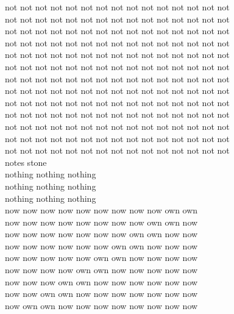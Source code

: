 not not not not not not not not not not not not not not not\\
not not not not not not not not not not not not not not not\\
not not not not not not not not not not not not not not not\\
not not not not not not not not not not not not not not not\\
not not not not not not not not not not not not not not not\\
not not not not not not not not not not not not not not not\\
not not not not not not not not not not not not not not not\\
not not not not not not not not not not not not not not not\\
not not not not not not not not not not not not not not not\\
not not not not not not not not not not not not not not not\\
not not not not not not not not not not not not not not not\\
not not not not not not not not not not not not not not not\\
not not not not not not not not not not not not not not not\\
notes stone\\
nothing nothing nothing\\
nothing nothing nothing\\
nothing nothing nothing\\
now now now now now now now now now own own\\
now now now now now now now now own own now\\
now now now now now now now own own now now\\
now now now now now now own own now now now\\
now now now now now own own now now now now\\
now now now now own own now now now now now\\
now now now own own now now now now now now\\
now now own own now now now now now now now\\
now own own now now now now now now now now\\


